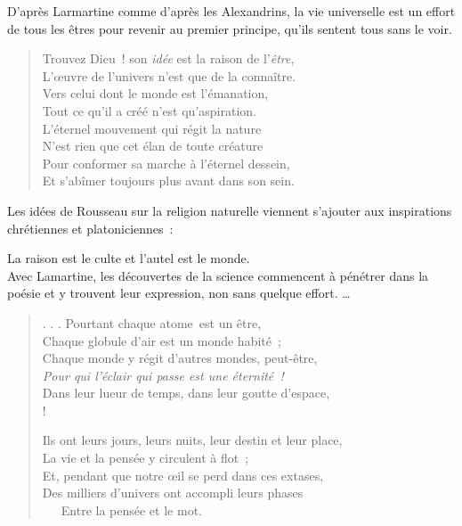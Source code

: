 \documentclass[french,twoside]{book} %
\begin{document}
\noindent D’après Larmartine comme d’après les Alexandrins, la vie universelle est un effort de tous les êtres pour revenir au premier principe, qu’ils sentent tous sans le voir.\par


\begin{verse}
Trouvez Dieu ! son \emph{idée} est la raison de l’\emph{être},\\
L’œuvre de l’univers n’est que de la connaître.\\
Vers celui dont le monde est l’émanation,\\
Tout ce qu’il a créé n’est qu’aspiration.\\
L’éternel mouvement qui régit la nature\\
N’est rien que cet élan de toute créature\\
Pour conformer sa marche à l’éternel dessein,\\
Et s’abîmer toujours plus avant dans son sein.\\
\end{verse}

\noindent Les idées de Rousseau sur la religion naturelle viennent s’ajouter aux inspirations chrétiennes et platoniciennes :\par

La raison est le culte et l’autel est le monde.\\

\noindent Avec Lamartine, les découvertes de la science commencent à pénétrer dans la poésie et y trouvent leur expression, non sans quelque effort. …\par


\begin{verse}
. . . Pourtant chaque atome est un être,\\
Chaque globule d’air est un monde habité ;\\
Chaque monde y régit d’autres mondes, peut-être,\\
\emph{Pour qui l’éclair qui passe est une éternité !}\\
Dans leur lueur de temps, dans leur goutte d’espace,\\!

Ils ont leurs jours, leurs nuits, leur destin et leur place,\\
La vie et la pensée y circulent à flot ;\\
Et, pendant que notre œil se perd dans ces extases,\\
Des milliers d’univers ont accompli leurs phases\\
   Entre la pensée et le mot.\\
\end{verse}
\end{document}
